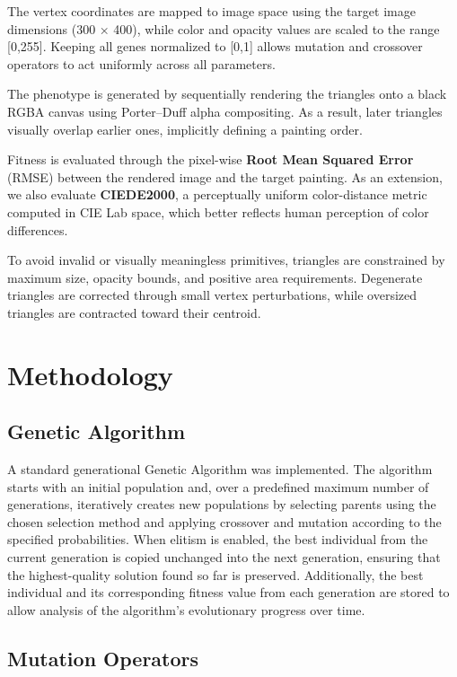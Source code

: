\documentclass[11pt,a4paper]{article}
\begin{document}
The vertex coordinates are mapped to image space using the target image dimensions (300 × 400), while color and opacity values are scaled to the range [0,255]. Keeping all genes normalized to [0,1] allows mutation and crossover operators to act uniformly across all parameters.

The phenotype is generated by sequentially rendering the triangles onto a black RGBA canvas using Porter–Duff alpha compositing. As a result, later triangles visually overlap earlier ones, implicitly defining a painting order.

Fitness is evaluated through the pixel-wise \textbf{Root Mean Squared Error} (RMSE) between the rendered image and the target painting. As an extension, we also evaluate \textbf{CIEDE2000}, a perceptually uniform color-distance metric computed in CIE Lab space, which better reflects human perception of color differences.

To avoid invalid or visually meaningless primitives, triangles are constrained by maximum size, opacity bounds, and positive area requirements. Degenerate triangles are corrected through small vertex perturbations, while oversized triangles are contracted toward their centroid.



\section{Methodology}

\subsection{Genetic Algorithm}

A standard generational Genetic Algorithm
\cite{eibensmith2015} was implemented. The algorithm starts with an initial
population and, over a predefined maximum number of generations, iteratively
creates new populations by selecting parents using the chosen selection
method and applying crossover and mutation according to the specified
probabilities. When elitism is enabled, the best individual from the current
generation is copied unchanged into the next generation, ensuring that the
highest-quality solution found so far is preserved. Additionally, the best
individual and its corresponding fitness value from each generation are
stored to allow analysis of the algorithm's evolutionary progress over time.


\subsection{Mutation Operators}
\end{document}
